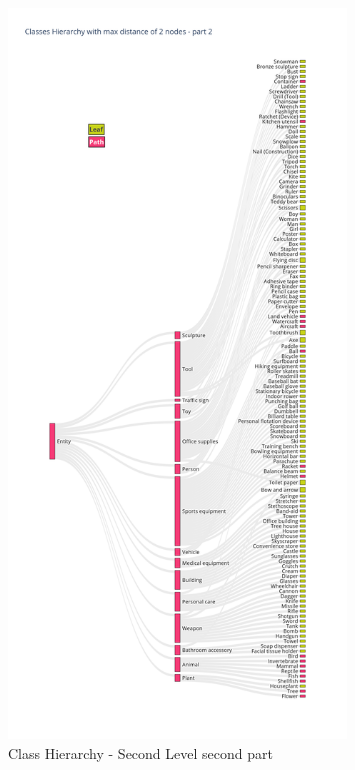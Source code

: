 \documentclass[11pt, a4paper, twocolumn]{article}
\begin{document}
\begin{appendices}
\begin{figure}[ht]
		\includegraphics[width=0.8\textwidth]{lvl2_classes_pt2.png}
		\caption{\scriptsize Class Hierarchy - Second Level second part}
	\end{figure}
	

\end{appendices}
\end{document}
